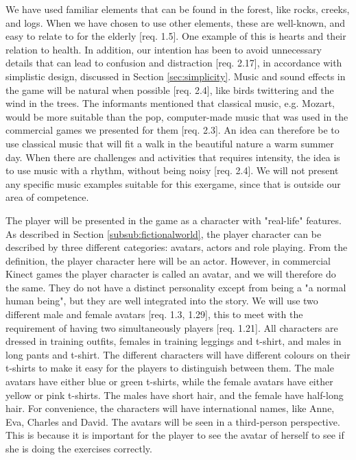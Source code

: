 We have used familiar elements that can be found in the forest, like rocks, creeks, and logs. When we have chosen to use other elements, these are well-known, and easy to relate to for the elderly [req. 1.5]. One example of this is hearts and their relation to health. In addition, our intention has been to avoid unnecessary details that can lead to confusion and distraction [req. 2.17], in accordance with simplistic design, discussed in Section \ref{sec:simplicity}. Music and sound effects in the game will be natural when possible [req. 2.4], like birds twittering and the wind in the trees. The informants mentioned that classical music, e.g. Mozart, would be more suitable than the pop, computer-made music that was used in the commercial games we presented for them [req. 2.3]. An idea can therefore be to use classical music that will fit a walk in the beautiful nature a warm summer day. When there are challenges and activities that requires intensity, the idea is to use music with a rhythm, without being noisy [req. 2.4]. We will not present any specific music examples suitable for this exergame, since that is outside our area of competence. 

The player will be presented in the game as a character with "real-life" features. As described in Section \ref{subsub:fictionalworld}, the player character can be described by three different categories: avatars, actors and role playing. From the definition, the player character here will be an actor. However, in commercial Kinect games the player character is called an avatar, and we will therefore do the same. They do not have a distinct personality except from being a "a normal human being", but they are well integrated into the story. We will use two different male and female avatars [req. 1.3, 1.29], this to meet with the requirement of having two simultaneously players [req. 1.21]. All characters are dressed in training outfits, females in training leggings and t-shirt, and males in long pants and t-shirt. The different characters will have different colours on their t-shirts to make it easy for the players to distinguish between them. The male avatars have either blue or green t-shirts, while the female avatars have either yellow or pink t-shirts. The males have short hair, and the female have half-long hair. For convenience, the characters will have international names, like Anne, Eva, Charles and David. The avatars will be seen in a third-person perspective. This is because it is important for the player to see the avatar of herself to see if she is doing the exercises correctly. 

